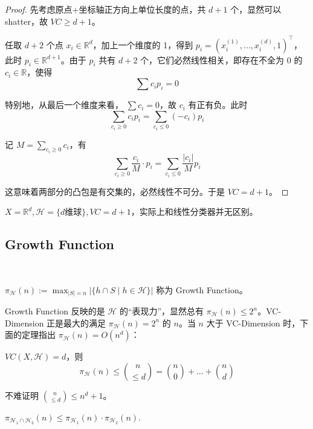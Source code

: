 \begin{proof}
    先考虑原点+坐标轴正方向上单位长度的点，共 $d+1$ 个，显然可以 shatter，故 $VC \ge d+1$。
    
    任取 $d+2$ 个点 $x_i \in \mathbb{R}^d$，加上一个维度的 1，得到 $p_i = (x_i^{(1)}, \dots, x_i^{(d)}, 1)^\top$，此时 $p_i \in \mathbb{R}^{d+1}$。由于 $p_i$ 共有 $d+2$ 个，它们必然线性相关，即存在不全为 $0$ 的 $c_i \in \mathbb{R}$，使得
    \[
        \sum c_i p_i = 0
    \]
    
    特别地，从最后一个维度来看， $\sum c_i = 0$，故 $c_i$ 有正有负。此时
    \[
        \sum_{c_i \ge 0} c_i p_i = \sum_{c_i \le 0} (-c_i) p_i
    \]
    
    记 $M = \sum_{c_i \ge 0} c_i$，有
    \[
        \sum_{c_i \ge 0} \frac{c_i}{M} \cdot p_i = \sum_{c_i \le 0} \frac{|c_i|}{M} p_i
    \]
    
    这意味着两部分的凸包是有交集的，必然线性不可分。于是 $VC = d+1$。
\end{proof}

\begin{corollary}
    $X=\mathbb{R}^d, \mathcal{H}=\{d\text{维球}\}, VC=d+1$，实际上和线性分类器并无区别。
\end{corollary}

\subsection{Growth Function} ~

\begin{definition}
    $\pi_{\mathcal{H}}(n) := \max_{|S|=n} |\{h \cap S \mid h \in \mathcal{H}\}|$ 称为 Growth Function。
\end{definition}

Growth Function 反映的是 $\mathcal{H}$ 的“表现力”，显然总有 $\pi_{\mathcal{H}}(n) \le 2^n$。VC-Dimension 正是最大的满足 $\pi_\mathcal{H}(n) = 2^n$ 的 $n$。当 $n$ 大于 VC-Dimension 时，下面的定理指出 $\pi_\mathcal{H}(n) = O(n^d)$：

\begin{theorem}
    $VC(X, \mathcal{H}) = d$，则
    \[
        \pi_{\mathcal{H}}(n) \le \binom{n}{\le d} = \binom{n}{0} + \dots + \binom{n}{d}
    \]
\end{theorem}

不难证明 $\binom{n}{\le d} \le n^d + 1$。

\begin{theorem}
    $\pi_{\mathcal{H}_1 \cap \mathcal{H}_2}(n) \le \pi_{\mathcal{H}_1}(n) \cdot \pi_{\mathcal{H}_2}(n)$.
\end{theorem}

